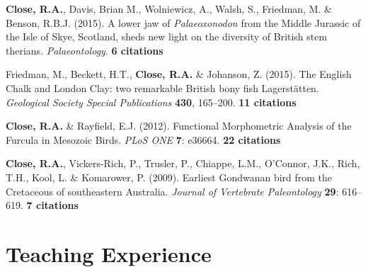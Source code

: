 \documentclass[a4paper, oneside, final]{scrartcl} %
\begin{document}
\begin{center}
\begin{flushleft}
\textbf{Close, R.A.}, Davis, Brian M., Wolniewicz, A., Walsh, S., Friedman, M. \& Benson, R.B.J. (2015). A lower jaw of \emph{Palaeoxonodon} from the Middle Jurassic of the Isle of Skye, Scotland, sheds new light on the diversity of British stem therians. \emph{Palaeontology}. 
\textbf{6 citations}
\vspace{6pt}

Friedman, M., Beckett, H.T., \textbf{Close, R.A.} \& Johanson, Z. (2015). The English Chalk and London Clay: two remarkable British bony fish Lagerst\"{a}tten. \emph{Geological Society Special Publications} \textbf{430}, 165--200.
\textbf{11 citations}
\vspace{6pt}


\textbf{Close, R.A.} \& Rayfield, E.J. (2012). Functional Morphometric Analysis of the Furcula in Mesozoic Birds. \emph{PLoS ONE} \textbf{7}: e36664. 
\textbf{22 citations}

\vspace{6pt}


\textbf{Close, R.A.}, Vickers-Rich, P., Trusler, P., Chiappe, L.M., O'Connor, J.K., Rich, T.H., Kool, L. \& Komarower, P. (2009). Earliest Gondwanan bird from the Cretaceous of southeastern Australia. \emph{Journal of Vertebrate Paleontology} \textbf{29}: 616--619. 
\textbf{7 citations}

\vspace{12pt}





\section{Teaching Experience}



\end{flushleft}
\end{center}
\end{document}
